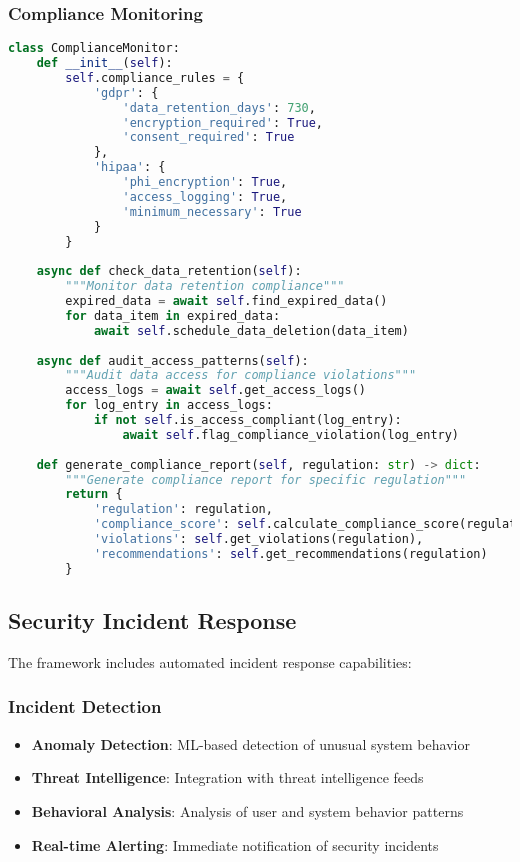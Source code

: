 \subsubsection{Compliance Monitoring}
\begin{lstlisting}[language=python, caption=Compliance Monitoring System]
class ComplianceMonitor:
    def __init__(self):
        self.compliance_rules = {
            'gdpr': {
                'data_retention_days': 730,
                'encryption_required': True,
                'consent_required': True
            },
            'hipaa': {
                'phi_encryption': True,
                'access_logging': True,
                'minimum_necessary': True
            }
        }
        
    async def check_data_retention(self):
        """Monitor data retention compliance"""
        expired_data = await self.find_expired_data()
        for data_item in expired_data:
            await self.schedule_data_deletion(data_item)
            
    async def audit_access_patterns(self):
        """Audit data access for compliance violations"""
        access_logs = await self.get_access_logs()
        for log_entry in access_logs:
            if not self.is_access_compliant(log_entry):
                await self.flag_compliance_violation(log_entry)
                
    def generate_compliance_report(self, regulation: str) -> dict:
        """Generate compliance report for specific regulation"""
        return {
            'regulation': regulation,
            'compliance_score': self.calculate_compliance_score(regulation),
            'violations': self.get_violations(regulation),
            'recommendations': self.get_recommendations(regulation)
        }
\end{lstlisting}

\subsection{Security Incident Response}

The framework includes automated incident response capabilities:

\subsubsection{Incident Detection}
\begin{itemize}
    \item \textbf{Anomaly Detection}: ML-based detection of unusual system behavior
    \item \textbf{Threat Intelligence}: Integration with threat intelligence feeds
    \item \textbf{Behavioral Analysis}: Analysis of user and system behavior patterns
    \item \textbf{Real-time Alerting}: Immediate notification of security incidents
\end{itemize}

